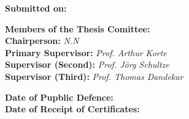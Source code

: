 \documentclass[
12pt, %
english, %
doublespacing, %
headsepline, %
chapterinoneline, %
]{MastersDoctoralThesis} %
\begin{document}
\begin{titlepage}
\begin{center}


 

 
  \end{center}
  \newpage
  
  \vspace{.1\textheight}
  \textbf{Submitted on:} \dotfill\\
  
  \vspace{.1\textheight}
  \begin{centering}
    {\Large\textbf{Members of the Thesis Comittee:}} \\
      \vspace{.1\textheight}
      {\Large
      \textbf{Chairperson: }\textit{ N.N} \\
      \textbf{Primary Supervisor: }\textit{Prof. Arthur Korte} \\
      \textbf{Supervisor (Second):  }\textit{Prof. J\"{o}rg Schultze } \\
      \textbf{Supervisor (Third):  }\textit{Prof. Thomas Dandekar} \\
      }
    \end{centering}
    \vspace{0.2\textheight}
    \noindent
    \textbf{Date of Pupblic Defence:} \dotfill \\
    \textbf{Date of Receipt of Certificates:}\dotfill
  
  
\end{titlepage}

\end{document}
